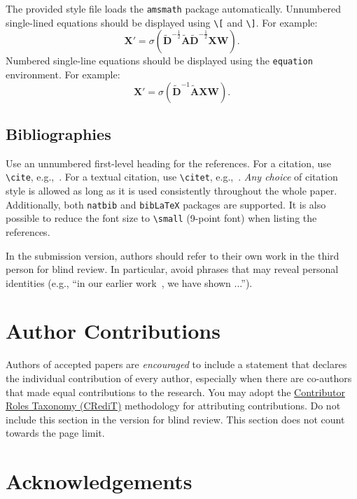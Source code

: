 \documentclass{article}
\begin{document}
The provided style file loads the \verb+amsmath+ package automatically.
Unnumbered single-lined equations should be displayed using \verb+\[+ and \verb+\]+. For example:
\[
	\mathbf{X}' = \sigma(\widetilde{\mathbf{D}}^{-\frac{1}{2}}\widetilde{\mathbf{A}}\widetilde{\mathbf{D}}^{-\frac{1}{2}} \mathbf{XW}).
\]
Numbered single-line equations should be displayed using the \verb+equation+ environment. For example:
\begin{equation}
	\mathbf{X}' = \sigma(\widetilde{\mathbf{D}}^{-1}\widetilde{\mathbf{A}}\mathbf{XW}).
\end{equation}

\subsection{Bibliographies}

Use an unnumbered first-level heading for the references.
For a citation, use \verb+\cite+, e.g.,~\cite{Kipf:2017tc}.
For a textual citation, use \verb+\citet+, e.g.,~\citet{Velickovic:2018we}.
\emph{Any choice} of citation style is allowed as long as it is used consistently throughout the whole paper.
Additionally, both \verb+natbib+ and \verb+bibLaTeX+ packages are supported.
It is also possible to reduce the font size to \verb+\small+ (9-point font) when listing the references.

In the submission version, authors should refer to their own work in the third person for blind review.
In particular, avoid phrases that may reveal personal identities (e.g., ``in our earlier work~\cite{Hamilton:2017tp}, we have shown ...'').

\section*{Author Contributions}
Authors of accepted papers are \emph{encouraged} to include a statement that declares the individual contribution of every author, especially when there are co-authors that made equal contributions to the research.
You may adopt the \href{https://credit.niso.org/}{Contributor Roles Taxonomy (CRediT)} methodology for attributing contributions.
Do not include this section in the version for blind review.
This section does not count towards the page limit.

\section*{Acknowledgements}
\end{document}
